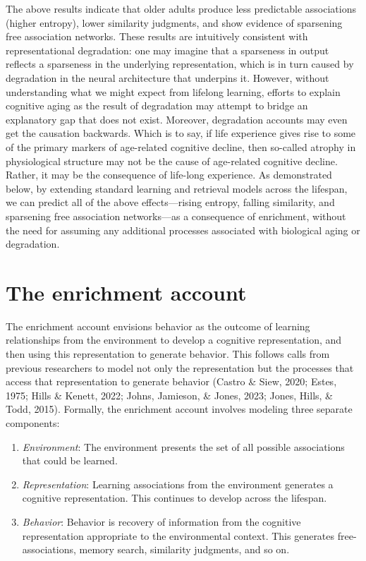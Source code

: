 \documentclass[
  man,floatsintext]{apa6}
\providecommand{\tightlist}{%
  \setlength{\itemsep}{0pt}\setlength{\parskip}{0pt}}
\begin{document}
The above results indicate that older adults produce less predictable associations (higher entropy), lower similarity judgments, and show evidence of sparsening free association networks. These results are intuitively consistent with representational degradation: one may imagine that a sparseness in output reflects a sparseness in the underlying representation, which is in turn caused by degradation in the neural architecture that underpins it. However, without understanding what we might expect from lifelong learning, efforts to explain cognitive aging as the result of degradation may attempt to bridge an explanatory gap that does not exist. Moreover, degradation accounts may even get the causation backwards. Which is to say, if life experience gives rise to some of the primary markers of age-related cognitive decline, then so-called atrophy in physiological structure may not be the cause of age-related cognitive decline. Rather, it may be the consequence of life-long experience. As demonstrated below, by extending standard learning and retrieval models across the lifespan, we can predict all of the above effects---rising entropy, falling similarity, and sparsening free association networks---as a consequence of enrichment, without the need for assuming any additional processes associated with biological aging or degradation.

\hypertarget{the-enrichment-account}{%
\section{The enrichment account}\label{the-enrichment-account}}

The enrichment account envisions behavior as the outcome of learning relationships from the environment to develop a cognitive representation, and then using this representation to generate behavior. This follows calls from previous researchers to model not only the representation but the processes that access that representation to generate behavior (Castro \& Siew, 2020; Estes, 1975; Hills \& Kenett, 2022; Johns, Jamieson, \& Jones, 2023; Jones, Hills, \& Todd, 2015). Formally, the enrichment account involves modeling three separate components:

\begin{enumerate}
\def\labelenumi{\arabic{enumi}.}
\tightlist
\item
  \emph{Environment}: The environment presents the set of all possible associations that could be learned.
\item
  \emph{Representation}: Learning associations from the environment generates a cognitive representation. This continues to develop across the lifespan.
\item
  \emph{Behavior}: Behavior is recovery of information from the cognitive representation appropriate to the environmental context. This generates free-associations, memory search, similarity judgments, and so on.
\end{enumerate}
\end{document}
